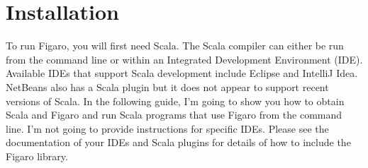 \section{Installation}

To run Figaro, you will first need Scala. The Scala compiler can either be run from the command line or within an Integrated Development Environment (IDE). Available IDEs that support Scala development include Eclipse and IntelliJ Idea. NetBeans also has a Scala plugin but it does not appear to support recent versions of Scala. In the following guide, I'm going to show you how to obtain Scala and Figaro and run Scala programs that use Figaro from the command line. I'm not going to provide instructions for specific IDEs. Please see the documentation of your IDEs and Scala plugins for details of how to include the Figaro library.

